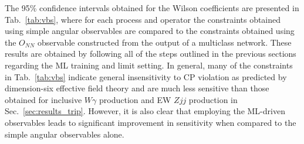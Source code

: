 \documentclass[twocolumn,preprintnumbers,superscriptaddress,nofootinbib,aps,prd,floatfix]{revtex4}
\begin{document}
The 95\% confidence intervals obtained for the Wilson coefficients are presented in Tab.~\ref{tab:vbs}, where for each process and operator the constraints obtained using simple angular observables are compared to the constraints obtained using the $O_{NN}$ observable constructed from the output of a multiclass network. These results are obtained by following all of the steps outlined in the previous sections regarding the ML training and limit setting. In general, many of the constraints in Tab.~\ref{tab:vbs} indicate general insensitivity to CP violation as predicted by dimension-six effective field theory and are much less sensitive than those obtained for inclusive $W\gamma$ production and EW $Zjj$ production in Sec.~\ref{sec:results_trip}. However, it is also clear that employing the ML-driven observables leads to significant  improvement in sensitivity when compared to the simple angular observables alone. 
\end{document}
